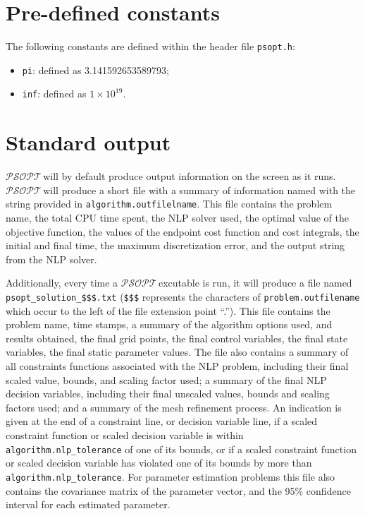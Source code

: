 \documentclass[a4paper,11pt]{report}    %
\newcommand{\psopt}{$\mathcal{PSOPT}$\,}  %
\begin{document}
\section{Pre-defined constants}

The following constants are defined within the header file \texttt{psopt.h}:

\begin{itemize}
 \item  \texttt{pi}: defined as 3.141592653589793;
 \item  \texttt{inf}: defined as $1 \times 10^{19}$.
\end{itemize}

\section{Standard output}

\psopt will by default produce output information on the screen as it runs.
\psopt will produce a short file with a summary of information named with the
string provided in \verb|algorithm.outfilelname|. This file contains the problem
name, the total CPU time spent, the NLP solver used, the optimal value of the
objective function, the values of the endpoint cost function and cost integrals,
the initial and final time, the maximum discretization error, and the output
string from the NLP solver.

Additionally, every time a \psopt excutable is run, it will produce a file 
named \verb|psopt_solution_$$$.txt| (\verb|$$$| represents the characters of \verb|problem.outfilename| which occur 
to the left of the file extension point ``.''). This file contains the problem name,
time stamps,  a summary of the algorithm options used, and results obtained,
the final grid points, the final control variables, the final state variables, the final static
parameter values.  The file
also contains  a summary of all constraints functions associated with the NLP problem, including their
final scaled value, bounds, and scaling factor used;  a summary of the final NLP decision variables, including their
final unscaled values, bounds and scaling factors used; and a summary of the mesh refinement process. An indication is given
at the end of a constraint line, or decision variable line, if a scaled constraint function or scaled decision variable is within  \verb|algorithm.nlp_tolerance|
of one of its bounds, or if a scaled constraint function or scaled decision variable has violated one of its bounds by more than \verb|algorithm.nlp_tolerance|.
For parameter estimation problems this file also contains the 
covariance matrix of the parameter vector, and the 95\% confidence interval for each estimated parameter.
\end{document}
